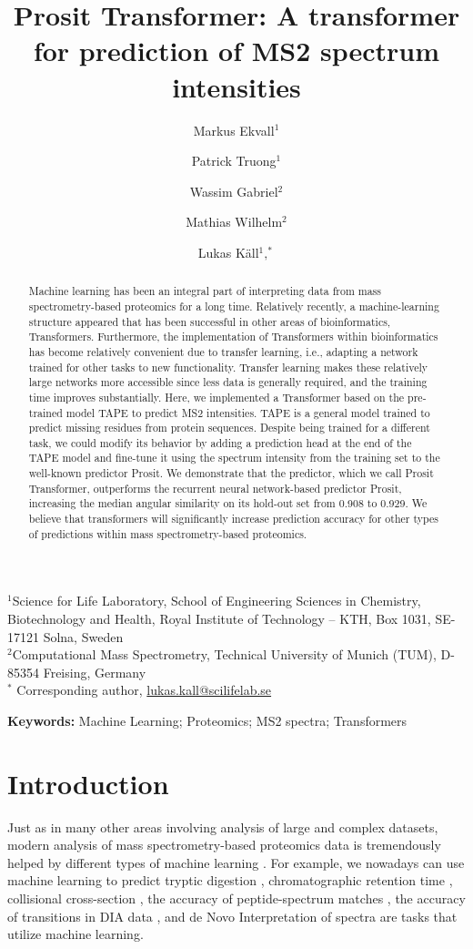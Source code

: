 \documentclass[10pt,a4paper]{article}
\title{Prosit Transformer: A transformer for prediction of MS2 spectrum intensities}
\author{Markus Ekvall$^1$ \and Patrick Truong$^1$ \and Wassim Gabriel$^2$ \and Mathias Wilhelm$^2$ \and Lukas K\"{a}ll$^1,^*$}
\begin{document}
\maketitle
$^1$Science for Life Laboratory, School of Engineering Sciences in Chemistry, Biotechnology and Health, Royal Institute of Technology -- KTH, Box 1031, SE-17121 Solna, Sweden\\
$^2$Computational Mass Spectrometry, Technical University of Munich (TUM), D-85354 Freising, Germany\\
$^*$ Corresponding author, \url{lukas.kall@scilifelab.se}

\begin{abstract}
Machine learning has been an integral part of interpreting data from mass spectrometry-based proteomics for a long time. Relatively recently, a machine-learning structure appeared that has been successful in other areas of bioinformatics, Transformers. Furthermore, the implementation of Transformers within bioinformatics has become relatively convenient due to transfer learning, i.e., adapting a network trained for other tasks to new functionality. Transfer learning makes these relatively large networks more accessible since less data is generally required, and the training time improves substantially.
Here, we implemented a Transformer based on the pre-trained model TAPE to predict MS2 intensities. TAPE is a general model trained to predict missing residues from protein sequences. Despite being trained for a different task, we could modify its behavior by adding a prediction head at the end of the TAPE model and fine-tune it using the spectrum intensity from the training set to the well-known predictor Prosit.
We demonstrate that the predictor, which we call Prosit Transformer, outperforms the recurrent neural network-based predictor Prosit, increasing the median angular similarity on its hold-out set from 0.908 to 0.929.
We believe that transformers will significantly increase prediction accuracy for other types of predictions within mass spectrometry-based proteomics.
\end{abstract}

{\bf Keywords:} Machine Learning; Proteomics; MS2 spectra; Transformers

\section*{Introduction}
Just as in many other areas involving analysis of large and complex datasets, modern analysis of mass spectrometry-based proteomics data is tremendously helped by different types of machine learning \cite{Meyer2021-hc,Mann2021-kx}. For example, we nowadays can use machine learning to predict tryptic digestion \cite{Yang2021-ng}, chromatographic retention time \cite{Moruz2010-ls,Ma2018-wy,Martens_undated-vs}, collisional cross-section \cite{Meier2021-ur}, the accuracy of peptide-spectrum matches \cite{Kall2007-ll}, the accuracy of transitions in DIA data \cite{Demichev2020-zd}, and de Novo Interpretation of spectra \cite{Tran2017-lk} are tasks that utilize machine learning.
\end{document}
